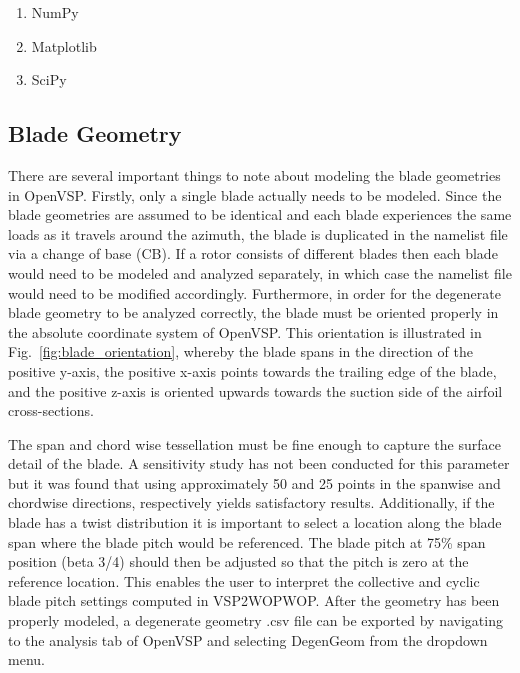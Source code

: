 \documentclass[journal ]{new-aiaa}
\begin{document}
\begin{enumerate}
\item NumPy
\item Matplotlib
\item SciPy
\end{enumerate}

\subsection{Blade Geometry}

There are several important things to note about modeling the blade geometries in OpenVSP. Firstly, only a single blade actually needs to be modeled. Since the blade geometries are assumed to be identical and each blade experiences the same loads as it travels around the azimuth, the blade is duplicated in the namelist file via a change of base (CB). If a rotor consists of different blades then each blade would need to be modeled and analyzed separately, in which case the namelist file would need to be modified accordingly. Furthermore, in order for the degenerate blade geometry to be analyzed correctly, the blade must be oriented properly in the absolute coordinate system of OpenVSP. This orientation is illustrated in Fig.~\ref{fig:blade_orientation}, whereby the blade spans in the direction of the positive y-axis, the positive x-axis points towards the trailing edge of the blade, and the positive z-axis is oriented upwards towards the suction side of the airfoil cross-sections. 

The span and chord wise tessellation must be fine enough to capture the surface detail of the blade. A sensitivity study has not been conducted for this parameter but it was found that using approximately 50 and 25 points in the spanwise and chordwise directions, respectively yields satisfactory results. Additionally, if the blade has a twist distribution it is important to select a location along the blade span where the blade pitch would be referenced. The blade pitch at 75\% span position (beta 3/4) should then be adjusted so that the pitch is zero at the reference location. This enables the user to interpret the collective and cyclic blade pitch settings computed in VSP2WOPWOP. After the geometry has been properly modeled, a degenerate geometry .csv file can be exported by navigating to the analysis tab of OpenVSP and selecting DegenGeom from the dropdown menu. 
\end{document}

